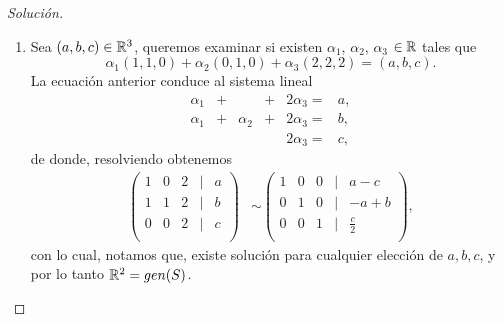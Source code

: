 \documentclass[a4,11pt]{aleph-notas}
\begin{document}
\begin{proof}[Solución]
\begin{enumerate}
        \item Sea $(a, b, c) \in \mathbb{R}^3$, queremos examinar si existen $\alpha_1$, $\alpha_2$, $\alpha_3$  $\in \mathbb{R}$ tales que  
        \[
        \alpha_{1} (1, 1, 0) + \alpha_{2} (0, 1, 0) + \alpha_{3} (2, 2, 2) =(a, b, c).
        \]
        La ecuación anterior conduce al sistema lineal
        \[
        \begin{array}{rrrrrrr}
         \alpha _{1} & + & & + & 2\alpha_{3} = & a, \\
         \alpha _{1} & + &\alpha_{2}& + &2\alpha_{3}= & b,\\
         & & & &2\alpha_{3}= & c,
         \end{array}
         \]
         de donde, resolviendo obtenemos
        \begin{align*}
        \begin{pmatrix}
            1&0&2&|&a\\
            1&1&2&|&b\\
            0&0&2&|&c\\
        \end{pmatrix}
        & \sim 
        \begin{pmatrix}
            1&0&0&|&a-c\\
            0&1&0&|&-a+b\\
            0&0&1&|&\frac{c}{2}\\
        \end{pmatrix},
        \end{align*}
        con lo cual, notamos que, existe solución para cualquier elección de $a, b, c$, y por lo tanto $\mathbb{R}^2 = gen (S)$. \qedhere
    \end{enumerate}
\end{proof}
\end{document}
